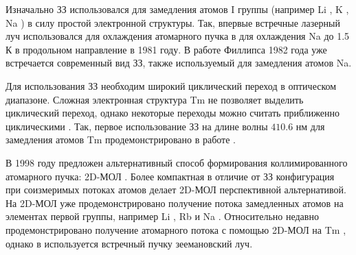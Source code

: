 


% 

Изначально ЗЗ использовался для замедления атомов I группы (например 
Li \cite{stack_ultra-cold_2010}, 
K \cite{Lee2007}, %
Na \cite{zhao2014optimizing}) в силу простой электронной структуры. Так, впервые встречные лазерный луч использовался для охлаждения атомарного пучка в \cite{__1981} для охлаждения Na до 1.5\,К в продольном направление в 1981 году. В работе Филлипса \cite{PhysRevLett.48.596} 1982 года уже встречается современный вид ЗЗ, также используемый для замедления атомов Na. 

Для использования ЗЗ необходим широкий циклический переход в оптическом диапазоне. Сложная электронная структура Tm не позволяет выделить циклический переход, однако некоторые переходы можно считать приближенно циклическими \cite{Kolachevsky2007}. Так, первое использование ЗЗ на длине волны $410.6$ нм для замедления атомов Tm продемонстрировано в работе \cite{Chebakov_2009}. 


В 1998 году предложен альтернативный способ формирования коллимированного атомарного пучка: 2D-МОЛ \cite{PhysRevA.58.3891}. Более компактная в отличие от ЗЗ конфигурация при соизмеримых потоках атомов делает 2D-МОЛ перспективной альтернативой. На 2D-МОЛ уже продемонстрировано получение потока замедленных атомов на элементах первой группы, например Li \cite{tiecke_high-flux_2009}, Rb \cite{ravenhall_high-flux_2021} и Na \cite{Lamporesi_2013}. Относительно недавно продемонстрировано получение атомарного потока с помощью 2D-МОЛ на Tm \cite{golovizin_compact_2021}, однако в \cite{golovizin_compact_2021} используется встречный пучку зеемановский луч. 



